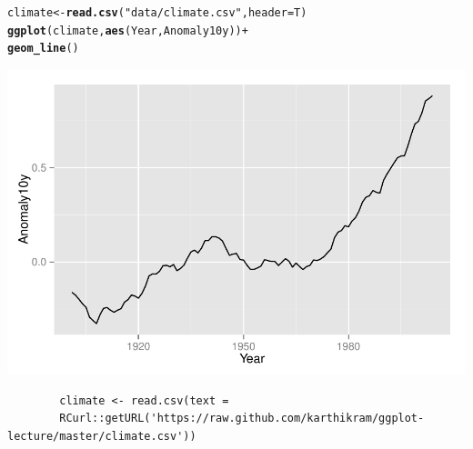 \documentclass{beamer}\usepackage[]{graphicx}\usepackage[]{color}
\makeatletter
\newcommand{\hlstr}[1]{\textcolor[rgb]{0.192,0.494,0.8}{#1}}%
\newcommand{\hlopt}[1]{\textcolor[rgb]{0,0,0}{#1}}%
\newcommand{\hlstd}[1]{\textcolor[rgb]{0.345,0.345,0.345}{#1}}%
\newcommand{\hlkwb}[1]{\textcolor[rgb]{0.69,0.353,0.396}{#1}}%
\newcommand{\hlkwc}[1]{\textcolor[rgb]{0.333,0.667,0.333}{#1}}%
\newcommand{\hlkwd}[1]{\textcolor[rgb]{0.737,0.353,0.396}{\textbf{#1}}}%
\newenvironment{kframe}{%
 \def\at@end@of@kframe{}%
 \ifinner\ifhmode%
  \def\at@end@of@kframe{\end{minipage}}%
  \begin{minipage}{\columnwidth}%
 \fi\fi%
 \def\FrameCommand##1{\hskip\@totalleftmargin \hskip-\fboxsep
 \colorbox{shadecolor}{##1}\hskip-\fboxsep
     \hskip-\linewidth \hskip-\@totalleftmargin \hskip\columnwidth}%
 \MakeFramed {\advance\hsize-\width
   \@totalleftmargin\z@ \linewidth\hsize
   \@setminipage}}%
 {\par\unskip\endMakeFramed%
 \at@end@of@kframe}
\newenvironment{knitrout}{}{} %
\makeatother
\begin{document}
\begin{frame}[fragile]
\begin{knitrout}\footnotesize
{}\color{fgcolor}\begin{kframe}


{\ttfamily\noindent\bfseries\color{errorcolor}{\#\# Error: cannot change working directory}}\end{kframe}
\end{knitrout}

\begin{knitrout}\footnotesize
{}\color{fgcolor}\begin{kframe}
\begin{alltt}
\hlstd{climate} \hlkwb{<-} \hlkwd{read.csv}\hlstd{(}\hlstr{"data/climate.csv"}\hlstd{,} \hlkwc{header} \hlstd{= T)}
\hlkwd{ggplot}\hlstd{(climate,} \hlkwd{aes}\hlstd{(Year, Anomaly10y))} \hlopt{+}
\hlkwd{geom_line}\hlstd{()}
\end{alltt}
\end{kframe}

{\centering \includegraphics[width=.75\linewidth]{figure/linea_} 

}



\end{knitrout}

\begin{flushright}
\begingroup
    \fontsize{6pt}{12pt}\selectfont
    \begin{verbatim}
        climate <- read.csv(text =
        RCurl::getURL('https://raw.github.com/karthikram/ggplot-lecture/master/climate.csv'))
    \end{verbatim}
\endgroup
\end{flushright}
\end{frame}
\end{document}

